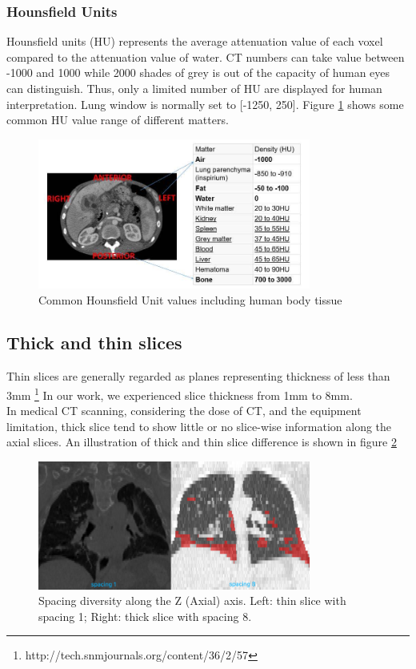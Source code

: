 \subsubsection{Hounsfield Units}
Hounsfield units (HU) represents the average attenuation value of each voxel compared to the attenuation value of water. CT numbers can take value between -1000 and 1000 while 2000 shades of grey is out of the capacity of human eyes can distinguish. Thus, only a limited number of HU are displayed for human interpretation. Lung window is normally set to [-1250, 250]. Figure \ref{fig:HU_value} shows some common HU value range of different matters.
\begin{figure}[h]
	\centering
	\includegraphics[width=0.8\textwidth]{img/background_img/HU_value.png}
	\caption{Common Hounsfield Unit values including human body tissue}
	\label{fig:HU_value}
\end{figure}

\subsection{Thick and thin slices}
Thin slices are generally regarded as planes representing thickness of less than 3mm \footnote{http://tech.snmjournals.org/content/36/2/57} In our work, we experienced slice thickness from 1mm to 8mm. \\
{\color{red} In medical CT scanning, considering the dose of CT, and the equipment limitation, thick slice tend to show little or no slice-wise information along the axial slices.} An illustration of thick and thin slice difference is shown in figure \ref{fig:thick_thin_slice}

\begin{figure}[h]
	\centering
	\includegraphics[width=0.8\textwidth]{img/background_img/thin_thick_slice.png}
	\caption{Spacing diversity along the Z (Axial) axis. Left: thin slice with spacing 1; Right: thick slice with spacing 8.}
	\label{fig:thick_thin_slice}
\end{figure}
\newpage

